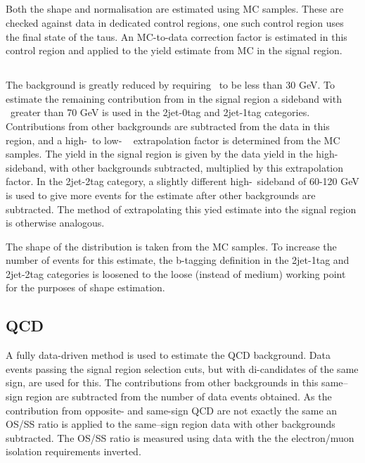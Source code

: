 \subsection{\texorpdfstring{\ttbar}{ttbar}}
Both the \ttbar shape and normalisation are estimated using \ac{MC} samples.
These are checked against data in dedicated control regions, one such control
region uses the \emu final state of the taus. An \ac{MC}-to-data correction factor is estimated in 
this control region and applied to the yield estimate from \ac{MC} in the signal region. 
\subsection{\texorpdfstring{\Wjets}{W + jets}}
\label{sec:hhh_backgrounds_wjets}
The \Wjets background is greatly reduced by requiring \mT~to
be less than 30 GeV. To estimate the remaining contribution
from \Wjets in the signal region a sideband with \mT~greater
than 70 GeV is used in the 2jet-0tag and 2jet-1tag categories.
Contributions from other backgrounds are subtracted 
from the data in this region, and a high-\mT~to low- \mT~
extrapolation factor is determined from the \Wjets \ac{MC} 
samples. The yield in the signal region is given by the data yield in the high-\mT sideband, with
other backgrounds subtracted, multiplied by this extrapolation factor.
In the 2jet-2tag category, a slightly different high-\mT~sideband of 60-120 GeV is used 
to give more events for the \Wjets estimate after other backgrounds are
subtracted. The method of extrapolating this yied estimate into
the signal region is otherwise analogous.

The shape of the \Wjets distribution is taken from the \ac{MC} samples. To 
increase the number of events for this estimate, the b-tagging definition
in the 2jet-1tag and 2jet-2tag categories is loosened to the loose (instead of medium)
working point for the purposes of shape estimation.
\subsection{QCD}
\label{sec:hhh_backgrounds_qcd}
A fully data-driven method is used to estimate the QCD background. Data events
passing the signal region selection cuts, but with di-\Pgt candidates of
the same sign, are used for this. The contributions from other backgrounds
in this same--sign region are subtracted from the number of data events obtained.
As the contribution from opposite- and same-sign QCD are
not exactly the same an OS/SS ratio is applied to the same--sign region data with other backgrounds subtracted.
The OS/SS ratio is measured using data with the 
the electron/muon isolation requirements inverted. 


